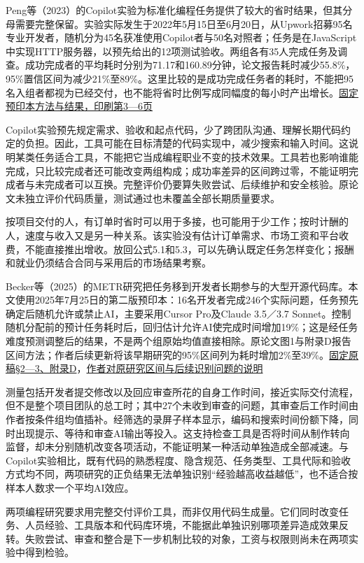 \documentclass[UTF8,fontset=windows,12pt,a4paper,oneside,openany]{ctexbook}
\begin{document}
Peng等（2023）的Copilot实验为标准化编程任务提供了较大的省时结果，但其分母需要完整保留。实验实际发生于2022年5月15日至6月20日，从Upwork招募95名专业开发者，随机分为45名获准使用Copilot者与50名对照者；任务是在JavaScript中实现HTTP服务器，以预先给出的12项测试验收。两组各有35人完成任务及调查。成功完成者的平均耗时分别为71.17和160.89分钟，论文报告耗时减少55.8\%，95\%置信区间为减少21\%至89\%。这里比较的是成功完成任务者的耗时，不能把95名入组者都视为已经交付，也不能将省时比例写成同幅度的每小时产出增长。\href{https://arxiv.org/pdf/2302.06590v1}{固定预印本方法与结果，印刷第3—6页}

Copilot实验预先规定需求、验收和起点代码，少了跨团队沟通、理解长期代码约定的负担。因此，工具可能在目标清楚的代码实现中，减少搜索和输入时间。这说明某类任务适合工具，不能把它当成编程职业不变的技术效果。工具若也影响谁能完成，只比较完成者还可能改变两组构成；成功率差异的区间跨过零，不能证明完成者与未完成者可以互换。完整评价仍要算失败尝试、后续维护和安全核验。原论文未独立评价代码质量，测试通过也未覆盖全部长期质量要求。

按项目交付的人，有订单时省时可以用于多接，也可能用于少工作；按时计酬的人，速度与收入又是另一种关系。该实验没有估计订单需求、市场工资和平台收费，不能直接推出增收。放回公式5.1和5.3，可以先确认既定任务怎样变化；报酬和就业仍须结合合同与采用后的市场结果考察。

Becker等（2025）的METR研究把任务移到开发者长期参与的大型开源代码库。本文使用2025年7月25日的第二版预印本：16名开发者完成246个实际问题，任务预先确定后随机允许或禁止AI，主要采用Cursor Pro及Claude 3.5／3.7 Sonnet。控制随机分配前的预计任务耗时后，回归估计允许AI使完成时间增加19\%；这是经任务难度预测调整后的结果，不是两个组原始均值直接相除。原论文图1与附录D报告区间方法；作者后续更新将该早期研究的95\%区间列为耗时增加2\%至39\%。\href{https://arxiv.org/pdf/2507.09089v2}{固定原稿§2—3、附录D}，\href{https://metr.org/blog/2026-02-24-uplift-update/}{作者对原研究区间与后续识别问题的说明}

测量包括开发者提交修改以及回应审查所花的自身工作时间，接近实际交付流程，但不是整个项目团队的总工时；其中27个未收到审查的问题，其审查后工作时间由作者按条件组均值插补。经筛选的录屏子样本显示，编码和搜索时间份额下降，同时出现提示、等待和审查AI输出等投入。这支持检查工具是否将时间从制作转向监督，却未分别随机改变各项活动，不能证明某一种活动单独造成全部减速。与Copilot实验相比，既有代码的熟悉程度、隐含规范、任务类型、工具代际和验收方式均不同，两项研究的正负结果无法单独识别“经验越高收益越低”，也不适合按样本人数求一个平均AI效应。

两项编程研究要求用完整交付评价工具，而非仅用代码生成量。它们同时改变任务、人员经验、工具版本和代码库环境，不能据此单独识别哪项差异造成效果反转。失败尝试、审查和整合是下一步机制比较的对象，工资与权限则尚未在两项实验中得到检验。
\end{document}
